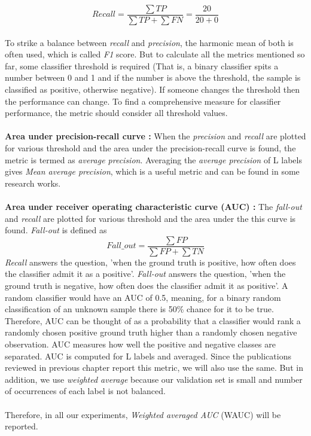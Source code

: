 \[
  Recall = \frac{\sum TP}{\sum TP + \sum FN} = \frac{20}{20+0} 
\]
\\
To strike a balance between \textit{recall} and \textit{precision}, the harmonic mean of both is often used, which is called \textit{F1} score. But to calculate all the metrics mentioned so far, some classifier threshold is required (That is, a binary classifier spits a number between 0 and 1 and if the number is above the threshold, the sample is classified as positive, otherwise negative). If someone changes the threshold then the performance can change. To find a comprehensive measure for classifier performance, the metric should consider all threshold values.\\
\\ 
\textbf{Area under precision-recall curve :} When the\textit{ precision} and \textit{recall} are plotted for various threshold and the area under the precision-recall curve is found, the metric is termed as \textit{average precision}. Averaging the \textit{average precision} of L labels gives \textit{Mean average precision}, which is a useful metric and can be found in some research works.\\
\\
\textbf{Area under receiver operating characteristic curve (AUC) :} The \textit{fall-out} and \textit{recall} are plotted for various threshold and the area under the this curve is found. \textit{Fall-out} is defined as
\[
   Fall\_out = \frac{\sum FP}{\sum FP + \sum TN} 
\]
\textit{Recall} answers the question, 'when the ground truth is positive, how often does the classifier admit it as a positive'. \textit{Fall-out} answers the question, 'when the ground truth is negative, how often does the classifier admit it as positive'. A random classifier would have an AUC of 0.5, meaning, for a binary random classification of an unknown sample there is 50\% chance for it to be true. Therefore, AUC can be thought of as a probability that a classifier would rank a randomly chosen positive ground truth higher than a randomly chosen negative observation. AUC measures how well the positive and negative classes are separated. AUC is computed for L labels and averaged. Since the publications reviewed in previous chapter report this metric, we will also use the same. But in addition, we use \textit{weighted average} because our validation set is small and number of occurrences of each label is not balanced.\\
\\
Therefore, in all our experiments, \textit{Weighted averaged AUC} (WAUC) will be reported.

